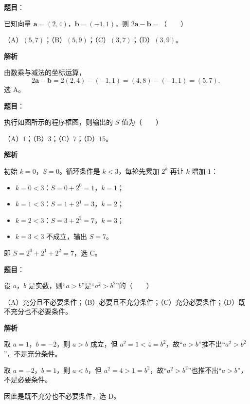 \begin{answer}

\textbf{题目}：

已知向量 $\boldsymbol a=(2,4)$，$\boldsymbol b=(-1,1)$，则 $2\boldsymbol a-\boldsymbol b=$\mbox{（　　）}

（A）$(5,7)$；（B）$(5,9)$；（C）$(3,7)$；（D）$(3,9)$。

\textbf{解析}

由数乘与减法的坐标运算，
\nopagebreak[4]
\[2\boldsymbol a-\boldsymbol b=2(2,4)-(-1,1)=(4,8)-(-1,1)=(5,7),\]
选 A。


\end{answer}
\begin{answer}

\textbf{题目}：

执行如图所示的程序框图，则输出的 $S$ 值为\mbox{（　　）}
\nopagebreak[4]
\begin{center}\end{center}
\nopagebreak[4]
（A）$1$；（B）$3$；（C）$7$；（D）$15$。

\textbf{解析}

初始 $k=0$，$S=0$。循环条件是 $k<3$，每轮先累加 $2^k$ 再让 $k$ 增加 $1$：

\begin{itemize}
\item $k=0<3$：$S=0+2^0=1$，$k=1$；
\item $k=1<3$：$S=1+2^1=3$，$k=2$；
\item $k=2<3$：$S=3+2^2=7$，$k=3$；
\item $k=3<3$ 不成立，输出 $S=7$。
\end{itemize}

即 $S=2^0+2^1+2^2=7$，选 C。


\end{answer}
\begin{answer}

\textbf{题目}：

设 $a$，$b$ 是实数，则“$a>b$”是“$a^2>b^2$”的\mbox{（　　）}

（A）充分且不必要条件；（B）必要且不充分条件；（C）充分必要条件；（D）既不充分也不必要条件。

\textbf{解析}

取 $a=1$，$b=-2$，则 $a>b$ 成立，但 $a^2=1<4=b^2$，故“$a>b$”推不出“$a^2>b^2$”，不是充分条件。

取 $a=-2$，$b=1$，则 $a<b$，但 $a^2=4>1=b^2$，故“$a^2>b^2$”也推不出“$a>b$”，不是必要条件。

因此是既不充分也不必要条件，选 D。


\end{answer}
